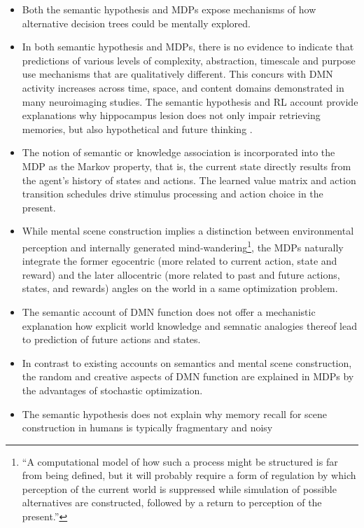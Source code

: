 \documentclass{article} %
\begin{document}
\begin{itemize}
  \item Both the semantic hypothesis and MDPs expose mechanisms of
  how alternative decision trees could be mentally explored.
  \item In both semantic hypothesis and MDPs,
  there is no evidence to indicate that predictions of various
  levels of complexity, abstraction, timescale and purpose
  use mechanisms that are qualitatively different. This concurs with
  DMN activity increases across time, space, and content domains
  demonstrated in many neuroimaging studies. The semantic hypothesis
  and RL account provide explanations why hippocampus lesion does
  not only impair retrieving memories, but also hypothetical and future
  thinking \citep{hassabis2007patients}.
  \item The notion of semantic or knowledge association is
  incorporated into the MDP as the Markov property,
  that is, the current state directly results from the
  agent's history of states and actions. The learned
  value matrix and action transition schedules drive
  stimulus processing and action choice in the present.
  \item While mental scene construction implies a distinction between
  environmental perception and internally generated mind-wandering\footnote{
  ``A computational model of how such a process might be structured
  is far from being defined, but it will probably require a form of
  regulation by which perception of the current world is suppressed
  while simulation of possible alternatives are constructed,
  followed by a return to perception of the present.''\citep{buckner2007self}},
  the MDPs naturally integrate the former egocentric
  (more related to current action, state and reward) and the later
  allocentric (more related to past and future actions, states, and rewards)
  angles on the world in a same optimization problem.
  \item The semantic account of DMN function does not offer
  a mechanistic explanation how explicit world knowledge and semnatic analogies thereof
  lead to prediction of future actions and states.
  \item In contrast to existing accounts on semantics and
  mental scene construction, the random and creative aspects of DMN function
  are explained in MDPs by the advantages of stochastic optimization.
  \item The semantic hypothesis does not explain why memory recall
  for scene construction in humans is typically fragmentary and noisy

\end{itemize}
\end{document}
